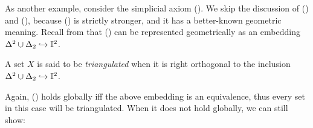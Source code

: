 As another example, consider the simplicial axiom (\AxiomSL). We skip the discussion of (\AxiomL) and (\AxiomCL), because (\AxiomSL) is strictly stronger, and it has a better-known geometric meaning. Recall from  that (\AxiomSL) can be represented geometrically as an embedding $\Delta^2\cup\Delta_2 \hookrightarrow \mathbb{I}^2$.

\begin{definition}
  A set $X$ is said to be \emph{triangulated} when it is right orthogonal to the inclusion $\Delta^2 \cup \Delta_2 \hookrightarrow \mathbb{I}^2$.
\end{definition}

Again, (\AxiomSL) holds globally iff the above embedding is an equivalence, thus every set in this case will be triangulated. When it does not hold globally, we can still show:

